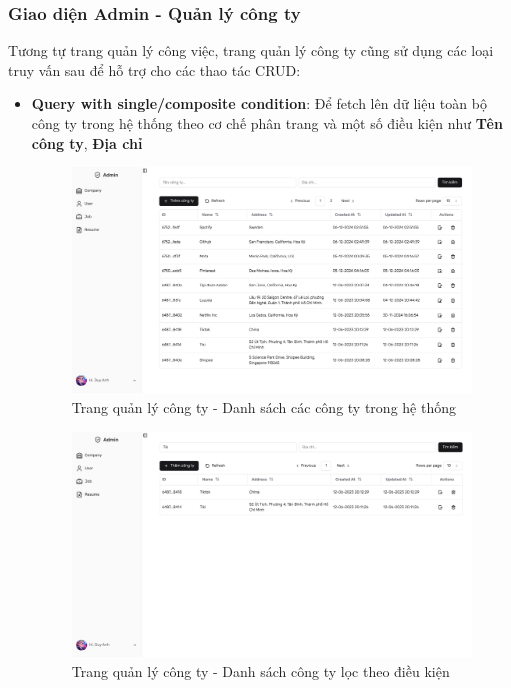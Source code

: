 \subsubsection{Giao diện Admin - Quản lý công ty}

Tương tự trang quản lý công việc, trang quản lý công ty cũng sử dụng các loại truy vấn sau để hỗ trợ cho các thao tác CRUD:
\begin{itemize}
    \item \textbf{Query with single/composite condition}: Để fetch lên dữ liệu toàn bộ công ty trong hệ thống theo cơ chế phân trang và một số điều kiện như \textbf{Tên công ty}, \textbf{Địa chỉ}
    \begin{figure}[H]
        \centering
        \includegraphics[width=\linewidth]{DBMS-Application/Images/admin-company.png}
        \caption{Trang quản lý công ty - Danh sách các công ty trong hệ thống}
        \label{fig:enter-label}
    \end{figure}

    \begin{figure}[H]
        \centering
        \includegraphics[width=\linewidth]{DBMS-Application/Images/admin-company-filter.png}
        \caption{Trang quản lý công ty - Danh sách công ty lọc theo điều kiện}
        \label{fig:enter-label}
    \end{figure}
    

\end{itemize}
